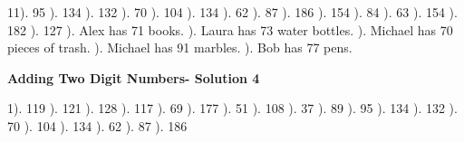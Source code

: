 \documentclass{article}%
\begin{document}
11). 95%
). 134%
). 132%
). 70%
). 104%
). 134%
). 62%
). 87%
). 186%
). 154%
). 84%
). 63%
). 154%
). 182%
). 127%
). Alex has 71 books.%
). Laura has 73 water bottles.%
). Michael has 70 pieces of trash.%
). Michael has 91 marbles.%
). Bob has 77 pens.%
\newline%
\newpage%
\large%
\begin{center}%
\textbf{Adding Two Digit Numbers- Solution 4}%
\newline%
\end{center} \normalsize%
1). 119%
). 121%
). 128%
). 117%
). 69%
). 177%
). 51%
). 108%
). 37%
). 89%
). 95%
). 134%
). 132%
). 70%
). 104%
). 134%
). 62%
). 87%
). 186%
\end{document}
